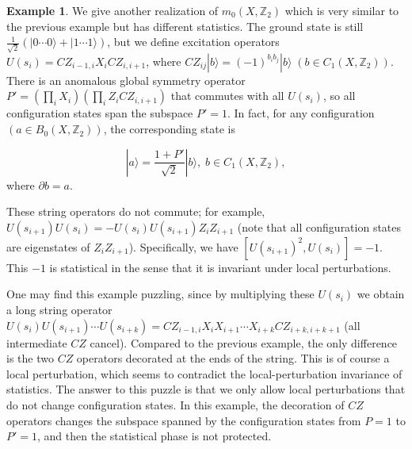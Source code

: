 \documentclass[reprint, amsmath, amssymb, showpacs, floatfix, longbibliography, aps, twocolumn, superscriptaddress, nofootinbib]{revtex4-2}
\newcommand{\ZZ}{{\mathbb Z}}
\theoremstyle{definition}
\newtheorem{example}{Example}[section]
\begin{document}
\begin{example}\label{expTwisted}
	We give another realization of $m_0(X,\ZZ_2)$ which is very similar to the previous example but has different statistics. The ground state is still $\frac{1}{\sqrt{2}}(|0\cdots0\rangle+|1\cdots1\rangle)$, but we define excitation operators $ U(s_i)=CZ_{i-1,i}X_iCZ_{i,i+1}$, where $CZ_{ij}|b\rangle=(-1)^{b_ib_j}|b\rangle\;(b\in C_1(X,\ZZ_2))$. There is an anomalous global symmetry operator $P'=(\prod_{i}X_i)(\prod_{i}Z_iCZ_{i,i+1})$ that commutes with all $ U(s_i)$, so all configuration states span the subspace $P'=1$. In fact, for any configuration $(a\in B_0(X,\ZZ_2))$, the corresponding state is
	
	\begin{equation}
		|a\rangle=\frac{1+P'}{\sqrt{2}}|b\rangle,\; b\in C_1(X,\ZZ_2), 
	\end{equation}
	where $\partial b=a$.
	
	These string operators do not commute; for example, $ U(s_{i+1}) U(s_i)=- U(s_i) U(s_{i+1})Z_iZ_{i+1}$ (note that all configuration states are eigenstates of $Z_iZ_{i+1}$). Specifically, we have $[ U(s_{i+1})^2, U(s_i)]=-1$. This $-1$ is statistical in the sense that it is invariant under local perturbations.
	
	One may find this example puzzling, since by multiplying these $ U(s_i)$ we obtain a long string operator $ U(s_i) U(s_{i+1})\cdots U(s_{i+k})=CZ_{i-1,i}X_iX_{i+1}\cdots X_{i+k}CZ_{i+k,i+k+1}$ (all intermediate $CZ$ cancel). Compared to the previous example, the only difference is the two $CZ$ operators decorated at the ends of the string. This is of course a local perturbation, which seems to contradict the local-perturbation invariance of statistics. The answer to this puzzle is that we only allow local perturbations that do not change configuration states. In this example, the decoration of $CZ$ operators changes the subspace spanned by the configuration states from $P=1$ to $P'=1$, and then the statistical phase is not protected.
\end{example}
\end{document}
